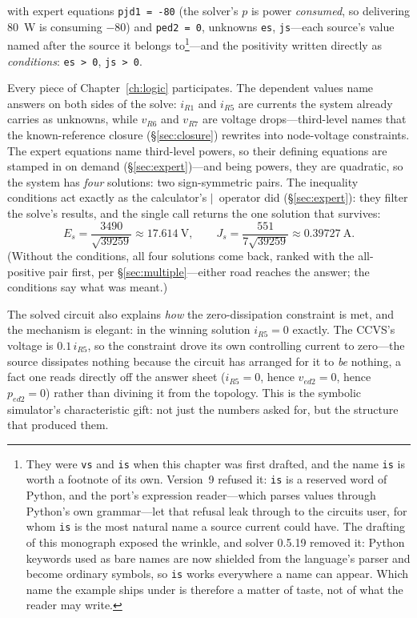 \documentclass[11pt,oneside]{report}
\newcommand{\code}[1]{\texttt{#1}}
\begin{document}
\noindent with expert equations \code{pjd1 = -80} (the solver's $p$
is power \emph{consumed}, so delivering 80~W is consuming $-80$) and
\code{ped2 = 0},
unknowns \code{es}, \code{js}---each source's value named after the
source it belongs to\footnote{They were \code{vs} and \code{is} when
this chapter was first drafted, and the name \code{is} is worth a
footnote of its own. Version~9 refused it: \code{is} is a reserved word
of Python, and the port's expression reader---which parses values
through Python's own grammar---let that refusal leak through to the
circuits user, for whom \code{is} is the most natural name a source
current could have. The drafting of this monograph exposed the wrinkle,
and solver 0.5.19 removed it: Python keywords used as bare names are
now shielded from the language's parser and become ordinary symbols, so
\code{is} works everywhere a name can appear. Which name the example
ships under is therefore a matter of taste, not of what the reader may
write.}---and the positivity written
directly as \emph{conditions}: \code{es > 0}, \code{js > 0}.

Every piece of Chapter~\ref{ch:logic} participates. The dependent
values name answers on both sides of the solve: $i_{R1}$ and
$i_{R5}$ are currents the system already carries as unknowns, while
$v_{R6}$ and $v_{R7}$ are voltage drops---third-level names that the
known-reference closure (\S\ref{sec:closure}) rewrites into
node-voltage constraints. The expert equations name third-level
powers, so their
defining equations are stamped in on demand
(\S\ref{sec:expert})---and being powers, they are quadratic, so the
system has \emph{four} solutions: two sign-symmetric pairs. The
inequality conditions act exactly as the calculator's
$\mid$~operator did (\S\ref{sec:expert}): they filter the solve's
results, and the single call returns the one solution that survives:
\[
E_s = \frac{3490}{\sqrt{39259}} \approx 17.614~\mathrm{V},
\qquad
J_s = \frac{551}{7\sqrt{39259}} \approx 0.39727~\mathrm{A}.
\]
(Without the conditions, all four solutions come back, ranked with
the all-positive pair first, per \S\ref{sec:multiple}---either road
reaches the answer; the conditions say what was meant.)

The solved circuit also explains \emph{how} the zero-dissipation
constraint is met, and the mechanism is elegant: in the winning
solution $i_{R5} = 0$ exactly. The CCVS's voltage is $0.1\,i_{R5}$,
so the constraint drove its own controlling current to zero---the
source dissipates nothing because the circuit has arranged for it to
\emph{be} nothing, a fact one reads directly off the answer sheet
($i_{R5} = 0$, hence $v_{ed2} = 0$, hence $p_{ed2} = 0$) rather than
divining it from the topology. This is the symbolic simulator's
characteristic gift: not just the numbers asked for, but the structure
that produced them.
\end{document}
